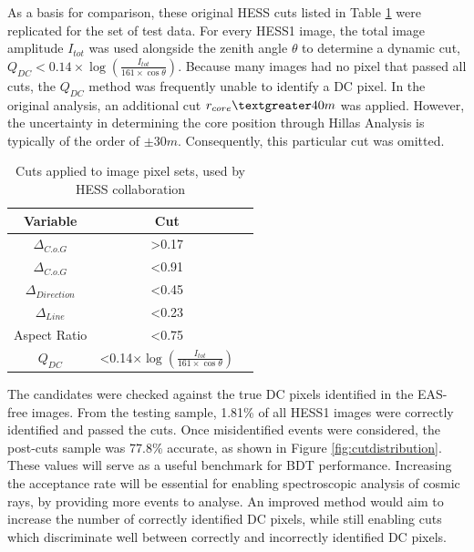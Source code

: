 \documentclass[11pt]{article}
\begin{document}
As a basis for comparison, these original HESS cuts listed in Table \ref{tab:qdccuts} were replicated for the set of test data. For every HESS1 image, the total image amplitude $I_{tot}$ was used alongside the zenith angle $\theta$ to determine a dynamic cut, $Q_{DC} < 0.14 \times \log(\frac{I_{tot}}{161 \times \cos \theta})$. Because many images had no pixel that passed all cuts, the $Q_{DC}$ method was frequently unable to identify a DC pixel. In the original analysis, an additional cut $r_{core} \textgreater 40m$ was applied. However, the uncertainty in determining the core position through Hillas Analysis is typically of the order of $\pm 30m$. Consequently, this particular cut was omitted.

\begin{table}[h!]
  \centering
  \caption{Cuts applied to image pixel sets, used by HESS collaboration \cite{hess07}}
  \label{tab:qdccuts}
  \begin{tabular}{ccc}
    \toprule
    Variable & Cut\\
    \midrule
     $ \Delta_{C.o.G}$ & \textgreater 0.17 \\
     $ \Delta_{C.o.G}$ & \textless 0.91 \\
     $\Delta_{Direction}$ & \textless 0.45 \\
     $\Delta_{Line}$ & \textless 0.23 \\
     Aspect Ratio & \textless 0.75 \\
     $Q_{DC}$ & \textless 0.14$ \times \log(\frac{I_{tot}}{161 \times \cos \theta})$ \\
    \bottomrule
  \end{tabular}
\end{table}

The candidates were checked against the true DC pixels identified in the EAS-free images. From the testing sample, 1.81\% of all HESS1 images were correctly identified and passed the cuts. Once misidentified events were considered, the post-cuts sample was 77.8\% accurate, as shown in Figure \ref{fig:cutdistribution}. These values will serve as a useful benchmark for BDT performance. Increasing the acceptance rate will be essential for enabling spectroscopic analysis of cosmic rays, by providing more events to analyse. An improved method would aim to increase the number of correctly identified DC pixels, while still enabling cuts which discriminate well between correctly and incorrectly identified DC pixels.
\end{document}
